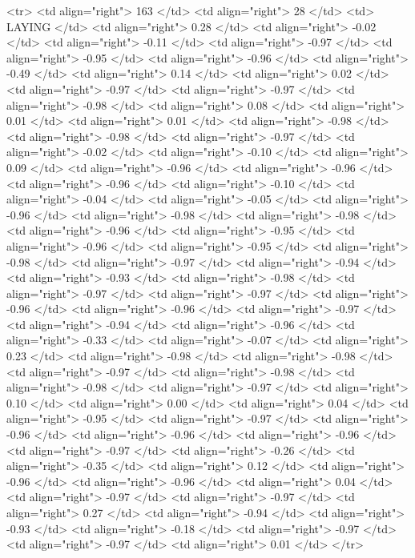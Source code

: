   <tr> <td align="right"> 163 </td> <td align="right">  28 </td> <td> LAYING </td> <td align="right"> 0.28 </td> <td align="right"> -0.02 </td> <td align="right"> -0.11 </td> <td align="right"> -0.97 </td> <td align="right"> -0.95 </td> <td align="right"> -0.96 </td> <td align="right"> -0.49 </td> <td align="right"> 0.14 </td> <td align="right"> 0.02 </td> <td align="right"> -0.97 </td> <td align="right"> -0.97 </td> <td align="right"> -0.98 </td> <td align="right"> 0.08 </td> <td align="right"> 0.01 </td> <td align="right"> 0.01 </td> <td align="right"> -0.98 </td> <td align="right"> -0.98 </td> <td align="right"> -0.97 </td> <td align="right"> -0.02 </td> <td align="right"> -0.10 </td> <td align="right"> 0.09 </td> <td align="right"> -0.96 </td> <td align="right"> -0.96 </td> <td align="right"> -0.96 </td> <td align="right"> -0.10 </td> <td align="right"> -0.04 </td> <td align="right"> -0.05 </td> <td align="right"> -0.96 </td> <td align="right"> -0.98 </td> <td align="right"> -0.98 </td> <td align="right"> -0.96 </td> <td align="right"> -0.95 </td> <td align="right"> -0.96 </td> <td align="right"> -0.95 </td> <td align="right"> -0.98 </td> <td align="right"> -0.97 </td> <td align="right"> -0.94 </td> <td align="right"> -0.93 </td> <td align="right"> -0.98 </td> <td align="right"> -0.97 </td> <td align="right"> -0.97 </td> <td align="right"> -0.96 </td> <td align="right"> -0.96 </td> <td align="right"> -0.97 </td> <td align="right"> -0.94 </td> <td align="right"> -0.96 </td> <td align="right"> -0.33 </td> <td align="right"> -0.07 </td> <td align="right"> 0.23 </td> <td align="right"> -0.98 </td> <td align="right"> -0.98 </td> <td align="right"> -0.97 </td> <td align="right"> -0.98 </td> <td align="right"> -0.98 </td> <td align="right"> -0.97 </td> <td align="right"> 0.10 </td> <td align="right"> 0.00 </td> <td align="right"> 0.04 </td> <td align="right"> -0.95 </td> <td align="right"> -0.97 </td> <td align="right"> -0.96 </td> <td align="right"> -0.96 </td> <td align="right"> -0.96 </td> <td align="right"> -0.97 </td> <td align="right"> -0.26 </td> <td align="right"> -0.35 </td> <td align="right"> 0.12 </td> <td align="right"> -0.96 </td> <td align="right"> -0.96 </td> <td align="right"> 0.04 </td> <td align="right"> -0.97 </td> <td align="right"> -0.97 </td> <td align="right"> 0.27 </td> <td align="right"> -0.94 </td> <td align="right"> -0.93 </td> <td align="right"> -0.18 </td> <td align="right"> -0.97 </td> <td align="right"> -0.97 </td> <td align="right"> 0.01 </td> </tr>
